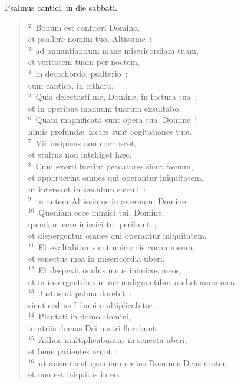 \lettrine[lines=3,image=true,loversize=0.05,lraise=-0.03]{P}{}salmus cantici, in die sabbati.
\begin{flushleft}\begin{verse}\vspace{6pt}${}^{2}$~Bonum est confiteri Domino,\\ et psallere nomini tuo, Altissime~:\\
${}^{3}$~ad annuntiandum mane misericordiam tuam,\\ et veritatem tuam per noctem,\\
${}^{4}$~in decachordo, psalterio~;\\ cum cantico, in cithara.\\
${}^{5}$~Quia delectasti me, Domine, in factura tua~;\\ et in operibus manuum tuarum exsultabo.\\
${}^{6}$~Quam magnificata sunt opera tua, Domine~!\\ nimis profund\ae\ fact\ae\ sunt cogitationes tu\ae .\\
${}^{7}$~Vir insipiens non cognoscet,\\ et stultus non intelliget h\ae c.\\
${}^{8}$~Cum exorti fuerint peccatores sicut fœnum,\\ et apparuerint omnes qui operantur iniquitatem,\\ ut intereant in s\ae culum s\ae culi~:\\
${}^{9}$~tu autem Altissimus in \ae ternum, Domine.\\
${}^{10}$~Quoniam ecce inimici tui, Domine,\\ quoniam ecce inimici tui peribunt~;\\ et dispergentur omnes qui operantur iniquitatem.\\
${}^{11}$~Et exaltabitur sicut unicornis cornu meum,\\ et senectus mea in misericordia uberi.\\
${}^{12}$~Et despexit oculus meus inimicos meos,\\ et in insurgentibus in me malignantibus audiet auris mea.\\
${}^{13}$~Justus ut palma florebit~;\\ sicut cedrus Libani multiplicabitur.\\
${}^{14}$~Plantati in domo Domini,\\ in atriis domus Dei nostri florebunt.\\
${}^{15}$~Adhuc multiplicabuntur in senecta uberi,\\ et bene patientes erunt~:\\
${}^{16}$~ut annuntient quoniam rectus Dominus Deus noster,\\ et non est iniquitas in eo.\end{verse}\end{flushleft}



